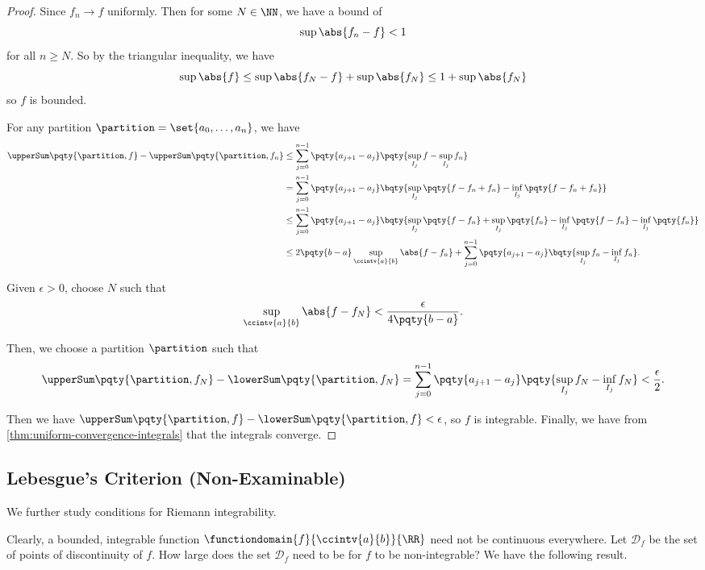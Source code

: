 \begin{proof}
    Since \(f_n \to f\) uniformly. Then for some \(N \in \NN\), we have a bound of
    \[
        \sup \abs{f_n - f} < 1
    \]
    for all \(n \geq N\). So by the triangular inequality, we have
    \[
        \sup \abs{f} \leq \sup \abs{f_N - f} + \sup \abs{f_N} \leq 1 + \sup \abs{f_N}
    \]
    so \(f\) is bounded.

    For any partition \(\partition = \set{a_0, \ldots, a_n}\), we have
    \begin{align*}
        \upperSum\pqty{\partition, f} - \upperSum\pqty{\partition, f_n} &\leq \sum_{j = 0}^{n - 1} \pqty{a_{j + 1} - a_j} \pqty{\sup_{I_j} f - \sup_{I_j} f_n} \\
        &= \sum_{j = 0}^{n - 1} \pqty{a_{j + 1} - a_j} \bqty{\sup_{I_j} \pqty{f - f_n + f_n} - \inf_{I_j} \pqty{f - f_n + f_n}} \\
        &\leq \sum_{j = 0}^{n - 1} \pqty{a_{j + 1} - a_j} \bqty{\sup_{I_j} \pqty{f - f_n} + \sup_{I_j} \pqty{f_n} - \inf_{I_j} \pqty{f - f_n} - \inf_{I_j} \pqty{f_n}} \\
        &\leq 2 \pqty{b - a} \sup_{\ccintv{a}{b}} \abs{f - f_n} + \sum_{j = 0}^{n - 1} \pqty{a_{j + 1} - a_j} \bqty{\sup_{I_j} f_n - \inf_{I_j} f_n}.
    \end{align*}

    Given \(\epsilon > 0\), choose \(N\) such that
    \[
        \sup_{\ccintv{a}{b}} \abs{f - f_N} < \frac{\epsilon}{4 \pqty{b - a}}.
    \]

    Then, we choose a partition \(\partition\) such that
    \[
        \upperSum\pqty{\partition, f_N} - \lowerSum\pqty{\partition, f_N} = \sum_{j = 0}^{n - 1} \pqty{a_{j + 1} - a_j} \pqty{\sup_{I_j} f_N - \inf_{I_j} f_N} < \frac{\epsilon}{2}.
    \]  

    Then we have \(\upperSum\pqty{\partition, f} - \lowerSum\pqty{\partition, f} < \epsilon\), so \(f\) is integrable. Finally, we have from \autoref{thm:uniform-convergence-integrals} that the integrals converge.
\end{proof}

\subsection{Lebesgue's Criterion (Non-Examinable)}

\small

We further study conditions for Riemann integrability.

Clearly, a bounded, integrable function \(\functiondomain{f}{\ccintv{a}{b}}{\RR}\) need not be continuous everywhere. Let \(\mathcal{D}_f\) be the set of points of discontinuity of \(f\). How large does the set \(\mathcal{D}_f\) need to be for \(f\) to be non-integrable? We have the following result.

